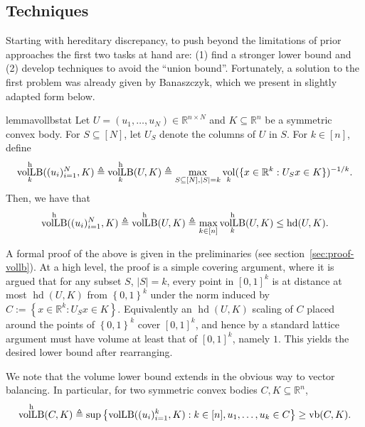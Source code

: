 \documentclass[11pt]{article}
\newcommand{\R}{{\mathbb{R}}}
\newcommand{\eqdef}{\triangleq}
\newcommand{\set}[1]{\left\{ #1 \right\}}
\DeclareMathOperator{\vollb}{volLB}
\DeclareMathOperator{\hd}{hd}
\DeclareMathOperator{\vb}{vb}
\DeclareMathOperator{\vol}{vol}
\begin{document}
\subsection{Techniques}

Starting with hereditary discrepancy, to push beyond the limitations of prior
approaches the first two tasks at hand are: (1) find a stronger lower bound and
(2) develop techniques to avoid the ``union bound''. Fortunately, a solution to the
first problem was already given by Banaszczyk\cite{Bana93}, which we present in
slightly adapted form below.

\begin{restatable}{lemma}{vollbstat} 
\label{lem:vol-lb}
Let $U=(u_1,\dots,u_N) \in \R^{n \times N}$ and $K \subseteq \R^n$ be a
symmetric convex body. For $S \subseteq [N]$, let $U_S$ denote the columns
of $U$ in $S$. For $k \in [n]$, define 
\begin{equation}
\label{eq:vol-lb}
\vollb^{\rm h}_k((u_i)_{i=1}^N,K) \eqdef \vollb^{\rm h}_k(U, K) \eqdef
\max_{S \subseteq [N],|S|=k} \vol_k(\{x \in \R^k: U_S x \in K\})^{-1/k}.
\end{equation}
Then, we have that
\begin{equation}
\label{eq:vol-lbh}
\vollb^{\rm h}((u_i)_{i=1}^N,K) \eqdef \vollb^{\rm h}(U,K) \eqdef \max_{k \in [n]} \vollb^{\rm h}_k(U,K) \leq \hd(U,K). 
\end{equation}
\end{restatable}

A formal proof of the above is given in the preliminaries (see
section~\ref{sec:proof-vollb}). At a high level, the proof is a simple covering
argument, where it is argued that for any subset $S$, $|S|=k$, every point in
$[0,1]^k$ is at distance at most $\hd(U,K)$ from $\set{0,1}^k$ under the norm
induced by $C := \set{x \in \R^k: U_S x \in K}$. Equivalently an $\hd(U,K)$
scaling of $C$ placed around the points of $\set{0,1}^k$ cover $[0,1]^k$, and
hence by a standard lattice argument must have volume at least that of
$[0,1]^k$, namely $1$. This yields the desired lower bound after rearranging. 

We note that the volume lower bound extends in the obvious way to vector
balancing. In particular, for two symmetric convex bodies $C,K \subseteq \R^n$,
\begin{equation}
\label{eq:vol-lb-vb}
\vollb^{\rm h}(C,K) \eqdef \sup \set{\vollb((u_i)_{i=1}^k,K):k \in [n],
u_1,\dots,u_k \in C} \geq \vb(C,K).
\end{equation}
\end{document}
